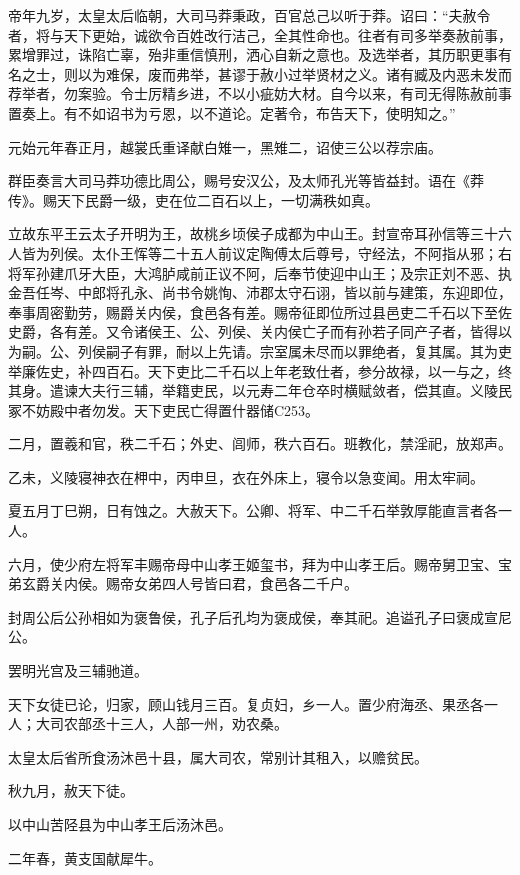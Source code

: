 \documentclass[]{article}
\begin{document}
帝年九岁，太皇太后临朝，大司马莽秉政，百官总己以听于莽。诏曰：``夫赦令者，将与天下更始，诚欲令百姓改行洁己，全其性命也。往者有司多举奏赦前事，累增罪过，诛陷亡辜，殆非重信慎刑，洒心自新之意也。及选举者，其历职更事有名之士，则以为难保，废而弗举，甚谬于赦小过举贤材之义。诸有臧及内恶未发而荐举者，勿案验。令士厉精乡进，不以小疵妨大材。自今以来，有司无得陈赦前事置奏上。有不如诏书为亏恩，以不道论。定著令，布告天下，使明知之。''

元始元年春正月，越裳氏重译献白雉一，黑雉二，诏使三公以荐宗庙。

群臣奏言大司马莽功德比周公，赐号安汉公，及太师孔光等皆益封。语在《莽传》。赐天下民爵一级，吏在位二百石以上，一切满秩如真。

立故东平王云太子开明为王，故桃乡顷侯子成都为中山王。封宣帝耳孙信等三十六人皆为列侯。太仆王恽等二十五人前议定陶傅太后尊号，守经法，不阿指从邪；右将军孙建爪牙大臣，大鸿胪咸前正议不阿，后奉节使迎中山王；及宗正刘不恶、执金吾任岑、中郎将孔永、尚书令姚恂、沛郡太守石诩，皆以前与建策，东迎即位，奉事周密勤劳，赐爵关内侯，食邑各有差。赐帝征即位所过县邑吏二千石以下至佐史爵，各有差。又令诸侯王、公、列侯、关内侯亡子而有孙若子同产子者，皆得以为嗣。公、列侯嗣子有罪，耐以上先请。宗室属未尽而以罪绝者，复其属。其为吏举廉佐史，补四百石。天下吏比二千石以上年老致仕者，参分故禄，以一与之，终其身。遣谏大夫行三辅，举籍吏民，以元寿二年仓卒时横赋敛者，偿其直。义陵民冢不妨殿中者勿发。天下吏民亡得置什器储C253。

二月，置羲和官，秩二千石；外史、闾师，秩六百石。班教化，禁淫祀，放郑声。

乙未，义陵寝神衣在柙中，丙申旦，衣在外床上，寝令以急变闻。用太牢祠。

夏五月丁巳朔，日有蚀之。大赦天下。公卿、将军、中二千石举敦厚能直言者各一人。

六月，使少府左将军丰赐帝母中山孝王姬玺书，拜为中山孝王后。赐帝舅卫宝、宝弟玄爵关内侯。赐帝女弟四人号皆曰君，食邑各二千户。

封周公后公孙相如为褒鲁侯，孔子后孔均为褒成侯，奉其祀。追谥孔子曰褒成宣尼公。

罢明光宫及三辅驰道。

天下女徒已论，归家，顾山钱月三百。复贞妇，乡一人。置少府海丞、果丞各一人；大司农部丞十三人，人部一州，劝农桑。

太皇太后省所食汤沐邑十县，属大司农，常别计其租入，以赡贫民。

秋九月，赦天下徒。

以中山苦陉县为中山孝王后汤沐邑。

二年春，黄支国献犀牛。
\end{document}
